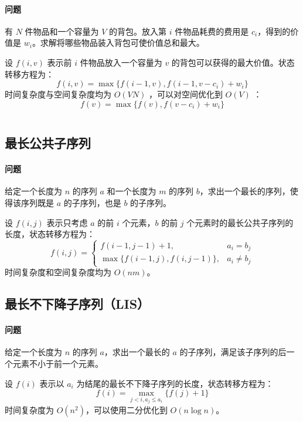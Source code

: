 \documentclass[a4paper, twoside]{article}
\begin{document}
    \paragraph{问题}有 $N$ 件物品和一个容量为 $V$ 的背包。放入第 $i$ 件物品耗费的费用是 $c_i$，得到的价值是 $w_i$。求解将哪些物品装入背包可使价值总和最大。

    设 $f(i, v)$ 表示前 $i$ 件物品放入一个容量为 $v$ 的背包可以获得的最大价值。状态转移方程为：
    $$f(i, v)=\max\{f(i-1, v), f(i-1, v-c_i)+ w_i\}$$
    时间复杂度与空间复杂度均为 $O(VN)$ ，可以对空间优化到 $O(V)$ ：
    $$f(v)=\max\{f(v), f(v-c_i)+w_i\}$$
    \inputminted{cpp}{../src/动态规划/0-1背包.cpp}

\subsection{最长公共子序列}
\paragraph{问题}给定一个长度为 $n$ 的序列 $a$ 和一个长度为 $m$ 的序列 $b$，求出一个最长的序列，使得该序列既是 $a$ 的子序列，也是 $b$ 的子序列。

设 $f(i, j)$ 表示只考虑 $a$ 的前 $i$ 个元素，$b$ 的前 $j$ 个元素时的最长公共子序列的长度，状态转移方程为：
$$
f(i, j) = \begin{cases}
    f(i-1, j-1)+1, & a_i = b_j \\
    \max\{f(i-1, j), f(i, j-1)\}, & a_i\neq b_j
\end{cases}
$$
时间复杂度和空间复杂度均为 $O(nm)$。

\subsection{最长不下降子序列（LIS）}
\paragraph{问题}给定一个长度为 $n$ 的序列 $a$，求出一个最长的 $a$ 的子序列，满足该子序列的后一个元素不小于前一个元素。

设 $f(i)$ 表示以 $a_i$ 为结尾的最长不下降子序列的长度，状态转移方程为：
$$
f(i) = \max \limits_{j < i, a_j \leq a_i}\{f(j) + 1\}
$$
时间复杂度为 $O(n^2)$，可以使用二分优化到 $O(n\log n)$。
\inputminted{cpp}{../src/动态规划/最长不下降子序列（LIS）.cpp}

\end{document}
